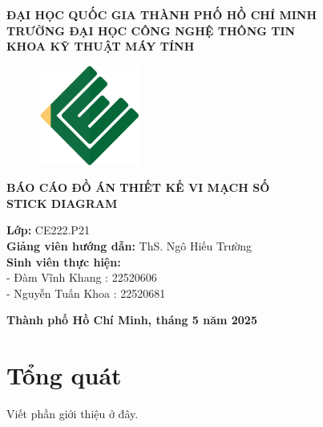 \documentclass[a4paper,12pt]{article}
\begin{document}
\thispagestyle{empty}
\begin{center}
\textbf{\Large ĐẠI HỌC QUỐC GIA THÀNH PHỐ HỒ CHÍ MINH}\\
\textbf{\Large TRƯỜNG ĐẠI HỌC CÔNG NGHỆ THÔNG TIN}\\
\textbf{\Large KHOA KỸ THUẬT MÁY TÍNH}\\[1cm]

\begin{figure}[H]
    \centering
    \includegraphics[width=0.3\textwidth]{../PNG/CE.png}
    \label{fig:LOGO_CE}\\
\end{figure}

\vspace {1cm}

\textbf{\Large BÁO CÁO ĐỒ ÁN THIẾT KẾ VI MẠCH SỐ}\\[0.5cm]
\textbf{\Large STICK DIAGRAM}\\[5cm]

\begin{flushleft}

\textbf{Lớp:} CE222.P21\\
\textbf{Giảng viên hướng dẫn:} ThS. Ngô Hiếu Trường\\
\textbf{Sinh viên thực hiện:} \\
- Đàm Vĩnh Khang : 22520606 \\
- Nguyễn Tuấn Khoa : 22520681\\[3.5cm]

\end{flushleft}
\end{center}
\begin{center}
\textbf{Thành phố Hồ Chí Minh, tháng 5 năm 2025}
\end{center}
\newpage
\setcounter{page}{1}
\tableofcontents
\newpage


\section{Tổng quát}
Viết phần giới thiệu ở đây.
\end{document}

